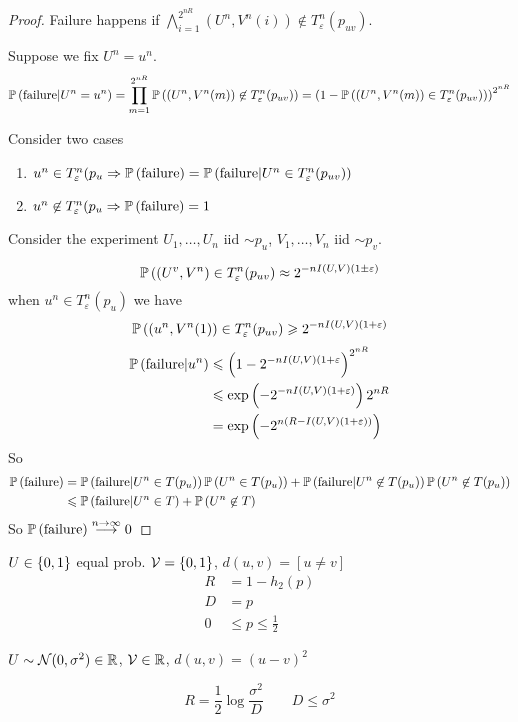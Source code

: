 \begin{proof}
    Failure happens if $\bigwedge\limits_{i=1}^{2^{nR}}(U^n, V^n(i)) \not\in T_\varepsilon^n(p_{uv})$.
    
    Suppose we fix $U^n = u^n$.
    \[
        \mathbb{P}\left( \text{failure} \vert U^n = u^n \right) = \prod\limits_{m=1}^{2^{nR}} \mathbb{P}\left( (U^n, V^n(m)) \not\in T_\varepsilon^n(p_{uv}) \right) = \left( 1-\mathbb{P}\left( (U^n, V^n(m)) \in T_\varepsilon^n(p_{uv}) \right) \right)^{2^{nR}}
    \]
    
    Consider two cases
    
    \begin{enumerate}
        \item $u^n \in T^n_\varepsilon(p_u \Rightarrow \mathbb{P}\left( \text{failure} \right) = \mathbb{P}\left( \text{failure} \vert U^n\in T_\varepsilon^n(p_{uv}) \right)$
        \item $u^n \not\in T^n_\varepsilon(p_u \Rightarrow \mathbb{P}\left( \text{failure} \right) = 1$
    \end{enumerate}
    
    Consider the experiment $U_1, \ldots, U_n$ iid $\sim p_u$, $V_1,\ldots, V_n$ iid $\sim p_v$.
    
    \[
        \mathbb{P}\left( (U^v,V^n)\in T_{\varepsilon}^n(p_{uv} \right) \approx 2^{-nI(U,V)(1\pm \varepsilon)}
    \]
    when $u^n \in T^n_\varepsilon(p_u)$ we have
    \[
        \mathbb{P}\left( (u^n, V^n(1))\in T^n_\varepsilon(p_{uv} \right) \geqslant 2^{-nI(U,V)(1+\varepsilon)}
    \]
    \[
        \begin{aligned}
            \mathbb{P}\left( \text{failure} \vert u^n \right) &\leqslant \left(1-2^{-nI(U,V)(1+\varepsilon}\right)^{2^{nR}}\\
            &\leqslant \exp\left(-2^{-nI(U,V)(1+\varepsilon)}\right) 2^{nR}\\
            &= \exp\left(-2^{n\left(R-I(U,V)(1+\varepsilon)\right)}\right)
        \end{aligned}
    \]
    So
    \[
        \begin{aligned}
            \mathbb{P}\left( \text{failure} \right) &= \mathbb{P}\left( \text{failure} \vert U^n \in T(p_u) \right)\mathbb{P}\left( U^n \in T(p_u) \right) + \mathbb{P}\left( \text{failure} \vert U^n \not\in T(p_u) \right)\mathbb{P}\left( U^n \not\in T(p_u) \right)\\
            &\leqslant \mathbb{P}\left( \text{failure} \vert U^n \in T \right) + \mathbb{P}\left( U^n\not\in T \right)
        \end{aligned}
    \]
    So $\mathbb{P}\left( \text{failure} \right) \overset{n\to\infty}{\longrightarrow} 0$
\end{proof}

\begin{example}
    $U\in\left\{ 0,1 \right\}$ equal prob. $\mathcal{V} = \left\{ 0,1 \right\}$, $d(u,v) = [u\neq v]$
    \[
        \begin{aligned}
            R &= 1-h_2(p)\\
            D &= p\\
            0 &\leqslant p \leqslant \frac{1}{2}
        \end{aligned}
    \]
\end{example}

\begin{example}
    $U\sim \mathcal{N}(0,\sigma^2) \in \mathbb{R}$, $\mathcal{V} \in \mathbb{R}$, $d(u,v) = (u-v)^2$
    
    \[
        R = \frac{1}{2} \log\frac{\sigma^2}{D}\qquad D \leqslant \sigma^2
    \]
\end{example}




\nocite{*}







